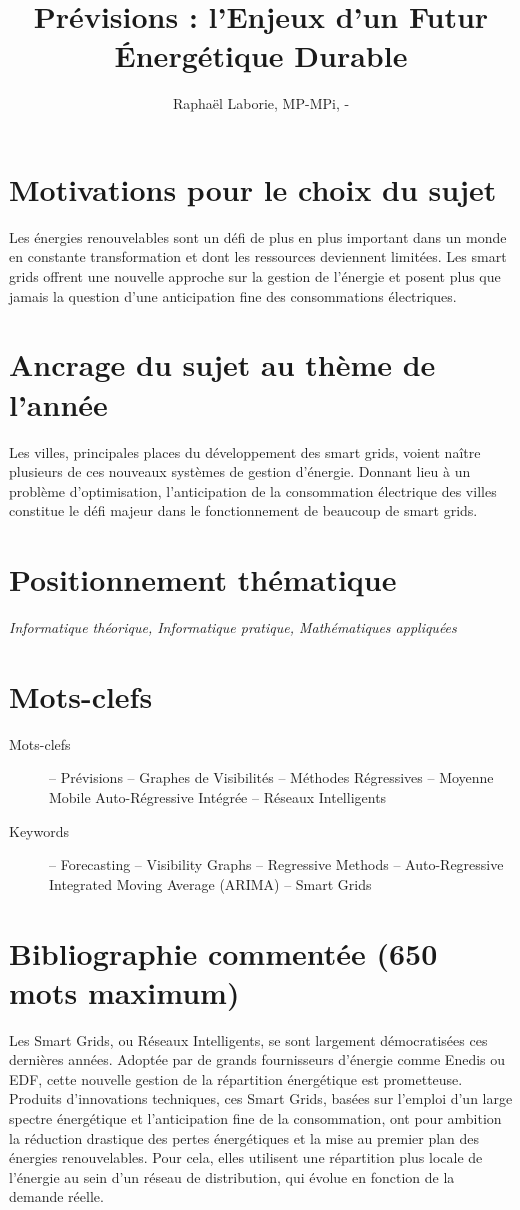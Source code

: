 \documentclass[12pt,a4paper]{article}
\title{Prévisions : l'Enjeux d'un Futur Énergétique Durable}
\author{Raphaël Laborie, MP\oldstylenums{1}-MPi, \oldstylenums{\the\year}-\oldstylenums{\arabic{nextyear}} }
\newcommand{\positionnementThematique}[1]{
\section*{Positionnement thématique}
{\it #1}}
\newcommand{\motclefs}[2]{
    \section*{Mots-clefs}
        \begin{description}
            \item[Mots-clefs] -- #1 
            \item[Keywords]   -- #2
        \end{description}
}
\begin{document}
\maketitle
\section*{Motivations pour le choix du sujet}
Les énergies renouvelables sont un défi de plus en plus important dans un monde en constante transformation et dont les ressources deviennent limitées.
Les smart grids offrent une nouvelle approche sur la gestion de l'énergie et posent plus que jamais la question d'une anticipation fine des consommations électriques.
\section*{Ancrage du sujet au thème de l'année}
Les villes, principales places du développement des smart grids, voient naître plusieurs de ces nouveaux systèmes de gestion d'énergie. Donnant lieu à un problème d'optimisation, l'anticipation de la consommation électrique des villes constitue le défi majeur dans le fonctionnement de beaucoup de smart grids.
\positionnementThematique{Informatique théorique, Informatique pratique, Mathématiques appliquées}
\motclefs{Prévisions -- Graphes de Visibilités -- Méthodes Régressives -- Moyenne Mobile Auto-Régressive Intégrée -- Réseaux Intelligents}{Forecasting -- Visibility Graphs -- Regressive Methods -- Auto-Regressive Integrated Moving Average (ARIMA) -- Smart Grids}
\section*{Bibliographie commentée (650 mots maximum)}

Les Smart Grids, ou Réseaux Intelligents, se sont largement démocratisées ces dernières années. Adoptée par de grands fournisseurs d'énergie comme Enedis ou EDF, cette nouvelle gestion de la répartition énergétique est prometteuse. Produits d'innovations techniques, ces Smart Grids, basées sur l'emploi d'un large spectre énergétique et l'anticipation fine de la consommation, ont pour ambition la réduction drastique des pertes énergétiques et la mise au premier plan des énergies renouvelables. Pour cela, elles utilisent une répartition plus locale de l'énergie au sein d'un réseau de distribution, qui évolue en fonction de la demande réelle.
\end{document}
